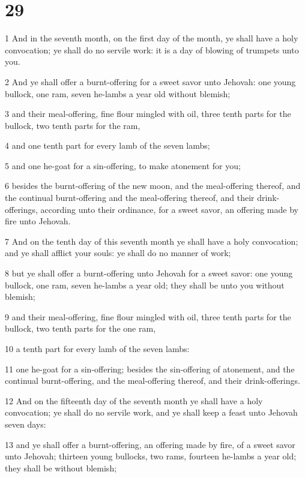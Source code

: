 \chapter{29}

\par 1 And in the seventh month, on the first day of the month, ye shall have a holy convocation; ye shall do no servile work: it is a day of blowing of trumpets unto you.
\par 2 And ye shall offer a burnt-offering for a sweet savor unto Jehovah: one young bullock, one ram, seven he-lambs a year old without blemish;
\par 3 and their meal-offering, fine flour mingled with oil, three tenth parts for the bullock, two tenth parts for the ram,
\par 4 and one tenth part for every lamb of the seven lambs;
\par 5 and one he-goat for a sin-offering, to make atonement for you;
\par 6 besides the burnt-offering of the new moon, and the meal-offering thereof, and the continual burnt-offering and the meal-offering thereof, and their drink-offerings, according unto their ordinance, for a sweet savor, an offering made by fire unto Jehovah.
\par 7 And on the tenth day of this seventh month ye shall have a holy convocation; and ye shall afflict your souls: ye shall do no manner of work;
\par 8 but ye shall offer a burnt-offering unto Jehovah for a sweet savor: one young bullock, one ram, seven he-lambs a year old; they shall be unto you without blemish;
\par 9 and their meal-offering, fine flour mingled with oil, three tenth parts for the bullock, two tenth parts for the one ram,
\par 10 a tenth part for every lamb of the seven lambs:
\par 11 one he-goat for a sin-offering; besides the sin-offering of atonement, and the continual burnt-offering, and the meal-offering thereof, and their drink-offerings.
\par 12 And on the fifteenth day of the seventh month ye shall have a holy convocation; ye shall do no servile work, and ye shall keep a feast unto Jehovah seven days:
\par 13 and ye shall offer a burnt-offering, an offering made by fire, of a sweet savor unto Jehovah; thirteen young bullocks, two rams, fourteen he-lambs a year old; they shall be without blemish;
